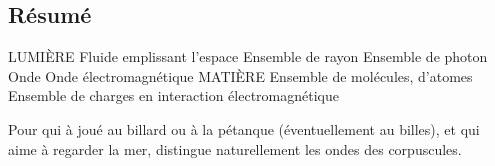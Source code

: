 \subsection{Résumé}

LUMIÈRE
	Fluide emplissant l'espace
	Ensemble de rayon
	Ensemble de photon
	Onde
	Onde électromagnétique
MATIÈRE
	Ensemble de molécules, d'atomes
	Ensemble de charges en interaction électromagnétique
	

Pour qui à joué au billard ou à la pétanque (éventuellement au billes), et qui aime à regarder la mer, distingue naturellement les ondes des corpuscules.


\subsection{}
\begin{center}
\end{center}

